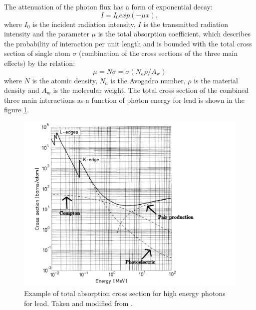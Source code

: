 \par
The attenuation of the photon flux has a form of exponential decay:
\begin{equation}
I = I_{0}exp(-\mu x),
\end{equation}
where $I_{0}$ is the incident radiation intensity, $I$ is the transmitted radiation intensity and the parameter $\mu$ is the total absorption coefficient, which describes the probability of interaction per unit length and is bounded with the total cross section of single atom $\sigma$ (combination of the cross sections of the three main effects) by the relation:
\begin{equation}
 \mu = N \sigma = \sigma(N_{a}\rho/A_{\textrm{w}})
 \end{equation}
where $N$ is the atomic density, $N_{a}$ is the Avogadro number, $\rho$ is the material density and $A_{\textrm{w}}$ is the molecular weight. The total cross section of the combined three main interactions as a function of photon energy for lead is shown in the figure \ref{cross}.
\begin{figure}[H]
 \centering
 \includegraphics[scale=0.6, angle = 0]{./pictures/totalCross}
 \caption{Example of total absorption cross section for high energy photons for lead. Taken and modified from \cite{Leo1987-wy}.}
 \label{cross}
 
\end{figure}
 


